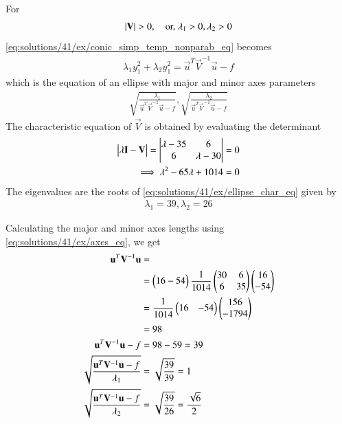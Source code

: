 For 
\begin{align} 
\left\vert\mathbf{V}\right\vert > 0, \quad \text{or, } \lambda_1 > 0, \lambda_2 > 0 
\end{align} 
\eqref{eq:solutions/41/ex/conic_simp_temp_nonparab_eq} becomes 
\begin{align} \lambda_1y_1^2 +\lambda_2y_1^2 = 
\vec{u}^T\vec{V}^{-1}\vec{u} -f 
\end{align} 
which is the equation of an ellipse with major and minor axes 
parameters
\begin{align} 
\sqrt{\frac{\lambda_1}{\vec{u}^T\vec{V}^{-1}\vec{u} -f}}, 
\sqrt{\frac{\lambda_2}{\vec{u}^T\vec{V}^{-1}\vec{u} -f}} \label{eq:solutions/41/ex/axes_eq}
\end{align}
The characteristic equation of $\vec{V}$ is obtained by evaluating the determinant
\begin{align}
\begin{vmatrix}\lambda \mathbf{I}-\mathbf{V}\end{vmatrix} = \begin{vmatrix}\lambda -35 & 6 \\ 6 & \lambda -30\end{vmatrix} &= 0
\\
\implies \lambda^2 - 65\lambda + 1014 &= 0
\label{eq:solutions/41/ex/ellipse_char_eq}
\end{align}
The eigenvalues are the roots of \eqref{eq:solutions/41/ex/ellipse_char_eq} given by
\begin{align}
\lambda_1 = 39, \lambda_2 = 26
\end{align}


Calculating the major and minor axes lengths using \eqref{eq:solutions/41/ex/axes_eq}, we get
\begin{align}
\mathbf{u}^T\mathbf{V}^{-1}\mathbf{u} &= \nonumber \\
&= \begin{pmatrix}16 -54\end{pmatrix}\frac{1}{1014}\begin{pmatrix}30 & 6 \\ 6 & 35 \end{pmatrix}\begin{pmatrix}16 \\ -54\end{pmatrix} \nonumber \\
&= \frac{1}{1014}\begin{pmatrix}16 & -54\end{pmatrix}\begin{pmatrix}156 \\ -1794\end{pmatrix} \nonumber \\
&= 98 \nonumber \\
\mathbf{u}^T\mathbf{V}^{-1}\mathbf{u} -f &= 98 - 59 = 39 \\
\sqrt{\frac{\mathbf{u}^T\mathbf{V}^{-1}\mathbf{u} -f}{\lambda_1}} &= \sqrt{\frac{39}{39}} = 1 \\
\sqrt{\frac{\mathbf{u}^T\mathbf{V}^{-1}\mathbf{u} -f}{\lambda_2}} &= \sqrt{\frac{39}{26}} = \frac{\sqrt{6}}{2}
\end{align}



